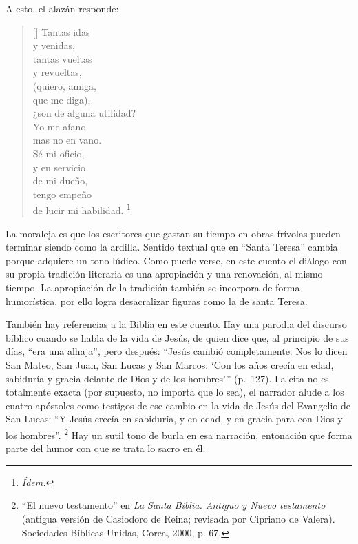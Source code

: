 \documentclass[14pt,twoside,final]{extbook} %
\let\oldfootnote\footnote
\renewcommand\footnote[1]{%
\oldfootnote{\hspace{1mm}#1}}
\begin{document}
A esto, el alazán responde:
\settowidth{\versewidth}{¿son de alguna utilidad?}
\begin{verse}[\versewidth]
Tantas idas \\
y venidas, \\
tantas vueltas \\
y revueltas, \\
(quiero, amiga, \\
que me diga), \\
¿son de alguna utilidad? \\
Yo me afano \\
mas no en vano. \\
Sé mi oficio, \\
y en servicio \\
de mi dueño, \\
tengo empeño \\
de lucir mi habilidad.\footnote{\em Ídem.}
\end{verse}
La moraleja es que los escritores que gastan su tiempo en obras frívolas pueden terminar siendo como la ardilla. Sentido textual que en ``Santa Teresa'' cambia porque adquiere un tono lúdico. Como puede verse, en este cuento el diálogo con su propia tradición literaria es una apropiación y una renovación, al mismo tiempo. La apropiación de la tradición también se incorpora de forma humorística, por ello logra desacralizar figuras como la de santa Teresa.

También hay referencias a la Biblia en este cuento. Hay una parodia del discurso bíblico cuando se habla de la vida de Jesús, de quien dice que, al principio de sus días, ``era una alhaja'', pero después: ``Jesús cambió completamente. Nos lo dicen San Mateo, San Juan, San Lucas y San Marcos: `Con los años crecía en edad, sabiduría y gracia delante de Dios y de los hombres'{}'' (p.~127). La cita no es totalmente exacta (por supuesto, no importa que lo sea), el narrador alude a los cuatro apóstoles como testigos de ese cambio en la vida de Jesús del Evangelio de San Lucas: ``Y Jesús crecía en sabiduría, y en edad, y en gracia para con Dios y los hombres''.\footnote{``El nuevo testamento'' en \emph{La Santa Biblia. Antiguo y Nuevo testamento} (antigua versión de Casiodoro de Reina; revisada por Cipriano de Valera). Sociedades Bíblicas Unidas, Corea, 2000, p. 67.} Hay un sutil tono de burla en esa narración, entonación que forma parte del humor con que se trata lo sacro en él.\protect\enlargethispage*{\baselineskip}
\end{document}
